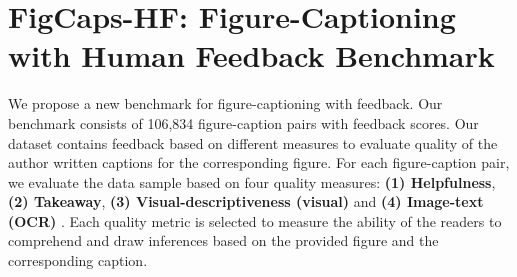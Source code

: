 \documentclass[11pt]{article}
\renewcommand{\cite}[1]{\citep{#1}}
\newcommand{\rev}[1]{\textcolor{blue}{#1}}
\begin{document}


\section{FigCaps-HF: Figure-Captioning with Human Feedback Benchmark}



We propose a new benchmark for figure-captioning with feedback. Our benchmark consists of 106,834 figure-caption pairs \cite{hsu-etal-2021-scicap-generating} with feedback scores.
Our dataset contains feedback based on different measures to evaluate quality of the author written captions for the corresponding figure. For each figure-caption pair, we evaluate the data sample based on four quality measures: \textbf{(1) Helpfulness}, \textbf{(2) Takeaway}, \textbf{(3) Visual-descriptiveness (visual)} and \textbf{(4) Image-text (OCR)} \cite{summaries-as-captions-preprint}. Each quality metric is selected to measure the ability of the readers to comprehend and draw inferences based on the provided figure and the corresponding caption. 
\end{document}

